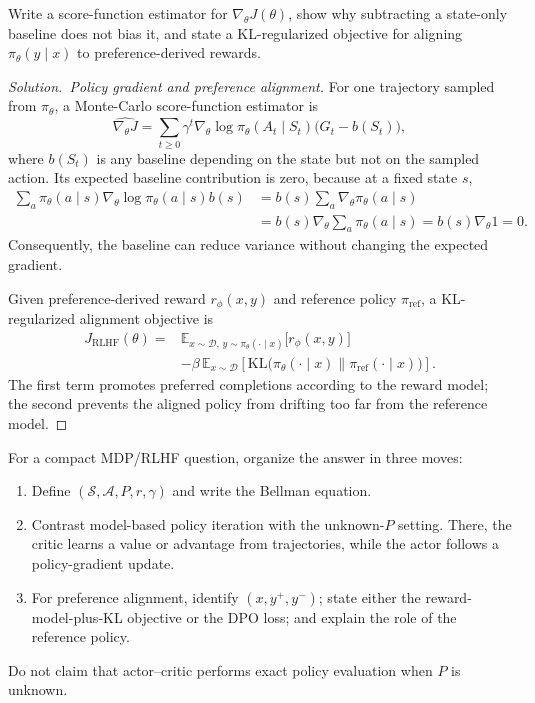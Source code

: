 \documentclass[11pt,a4paper]{article}
\theoremstyle{definition}
\newenvironment{solution}[1][]{\begin{proof}[Solution.\ #1]}{\end{proof}}
\begin{document}
\begin{exercise}
Write a score-function estimator for $\nabla_\theta J(\theta)$, show why subtracting a
state-only baseline does not bias it, and state a KL-regularized objective for aligning
$\pi_\theta(y\mid x)$ to preference-derived rewards.
\end{exercise}

\begin{solution}[Policy gradient and preference alignment]
For one trajectory sampled from $\pi_\theta$, a Monte-Carlo score-function estimator is
\[
\widehat{\nabla_\theta J}=
\sum_{t\geq0}\gamma^t
\nabla_\theta\log\pi_\theta(A_t\mid S_t)
\bigl(G_t-b(S_t)\bigr),
\]
where $b(S_t)$ is any baseline depending on the state but not on the sampled action. Its
expected baseline contribution is zero, because at a fixed state $s$,
\[
\begin{aligned}
\sum_a\pi_\theta(a\mid s)
\nabla_\theta\log\pi_\theta(a\mid s)b(s)
&=b(s)\sum_a\nabla_\theta\pi_\theta(a\mid s)\\
&=b(s)\nabla_\theta\sum_a\pi_\theta(a\mid s)
=b(s)\nabla_\theta1=0.
\end{aligned}
\]
Consequently, the baseline can reduce variance without changing the expected gradient.

Given preference-derived reward $r_\phi(x,y)$ and reference policy
$\pi_{\mathrm{ref}}$, a KL-regularized alignment objective is
\[
\begin{aligned}
J_{\mathrm{RLHF}}(\theta)
={}&\mathbb{E}_{x\sim\mathcal{D},\,y\sim\pi_\theta(\cdot\mid x)}
\bigl[r_\phi(x,y)\bigr]\\
&-\beta\,
\mathbb{E}_{x\sim\mathcal{D}}
\left[
\mathrm{KL}\bigl(
\pi_\theta(\cdot\mid x)
\mathbin{\|}\pi_{\mathrm{ref}}(\cdot\mid x)
\bigr)
\right].
\end{aligned}
\]
The first term promotes preferred completions according to the reward model; the second
prevents the aligned policy from drifting too far from the reference model.
\end{solution}

\begin{note}
For a compact MDP/RLHF question, organize the answer in three moves:
\begin{enumerate}
    \item Define $(\mathcal{S},\mathcal{A},P,r,\gamma)$ and write the Bellman equation.
    \item Contrast model-based policy iteration with the unknown-$P$ setting. There, the
    critic learns a value or advantage from trajectories, while the actor follows a
    policy-gradient update.
    \item For preference alignment, identify $(x,y^+,y^-)$; state either the
    reward-model-plus-KL objective or the DPO loss; and explain the role of the reference
    policy.
\end{enumerate}
Do not claim that actor--critic performs exact policy evaluation when $P$ is unknown.
\end{note}
\end{document}
